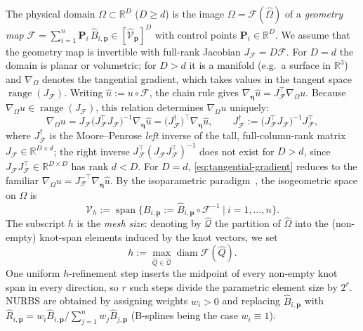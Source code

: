\documentclass{article}
\newcommand{\vect}[1]{\boldsymbol{#1}}
\newcommand{\R}{\mathbb{R}}
\DeclareMathOperator{\spann}{span}
\newcommand{\refdom}{\widehat{\Omega}}            %
\newcommand{\Bref}[2]{\widehat{B}_{#1,#2}}       %
\newcommand{\Bphy}[2]{B_{#1,#2}}                  %
\newcommand{\Rnurbs}[2]{\widehat{R}_{#1,#2}}     %
\newcommand{\Shat}[1]{\widehat{\mathcal{V}}_{#1}} %
\newcommand{\Vglo}{\mathcal{V}_h}                  %
\newcommand{\gmap}{\mathcal{F}}                   %
\theoremstyle{plain}
\numberwithin{equation}{section}
\begin{document}
The physical domain $\Omega \subset \R^{D}$ ($D \ge d$) is the image
$\Omega = \gmap(\refdom)$ of a \emph{geometry map}
$\gmap = \sum_{i=1}^{n} \vect{P}_i\, \Bref{i}{\vect{p}} \in
    [\Shat{\vect{p}}]^{D}$ with control points $\vect{P}_i \in \R^{D}$.
We assume that the geometry map is invertible with full-rank Jacobian $J_{\gmap} = D\gmap$.
For $D = d$ the domain is planar or volumetric; for $D > d$ it is a manifold
(e.g.\ a surface in $\R^3$) and $\nabla_\Omega$ denotes the tangential gradient,
which takes values in the tangent space $\operatorname{range}(J_{\gmap})$.  Writing
$\widehat u := u \circ \gmap$, the chain rule gives
$\nabla_{\vect\eta}\widehat u = J_{\gmap}^{\top}\nabla_\Omega u$.  Because
$\nabla_\Omega u \in \operatorname{range}(J_{\gmap})$, this relation determines
$\nabla_\Omega u$ uniquely:
\begin{equation}
    \nabla_\Omega u
    = J_{\gmap}\bigl(J_{\gmap}^{\top} J_{\gmap}\bigr)^{-1}
    \nabla_{\vect\eta}\widehat u
    = \bigl(J_{\gmap}^{\dagger}\bigr)^{\top}\nabla_{\vect\eta}\widehat u,
    \qquad
    J_{\gmap}^{\dagger} := \bigl(J_{\gmap}^{\top} J_{\gmap}\bigr)^{-1}
    J_{\gmap}^{\top},
    \label{eq:tangential-gradient}
\end{equation}
where $J_{\gmap}^{\dagger}$ is the Moore--Penrose \emph{left} inverse of the
tall, full-column-rank matrix $J_{\gmap} \in \R^{D\times d}$; the right inverse
$J_{\gmap}^{\top}(J_{\gmap}J_{\gmap}^{\top})^{-1}$ does not exist for $D>d$, since
$J_{\gmap}J_{\gmap}^{\top}\in\R^{D\times D}$ has rank $d<D$.  For $D=d$,
\eqref{eq:tangential-gradient} reduces to the familiar
$\nabla_\Omega u = J_{\gmap}^{-\top}\nabla_{\vect\eta}\widehat u$.
By the isoparametric paradigm~\cite{hughes2005isogeometric}, the isogeometric
space on $\Omega$ is
\begin{equation}
    \Vglo := \spann\bigl\{ \Bphy{i}{\vect{p}} := \Bref{i}{\vect{p}} \circ
    \gmap^{-1} \ \big|\ i = 1, \dots, n \bigr\}.
    \label{eq:isogeometric-space}
\end{equation}
The subscript $h$ is the \emph{mesh size}: denoting by $\widehat{\mathcal{Q}}$ the
partition of $\refdom$ into the (non-empty) knot-span elements induced by the
knot vectors, we set
\begin{equation}
    h := \max_{\widehat{Q}\in\widehat{\mathcal{Q}}}
    \operatorname{diam}\gmap(\widehat{Q}).
    \label{eq:mesh-size}
\end{equation}
One uniform $h$-refinement step inserts the midpoint of every non-empty knot
span in every direction, so $r$ such steps divide the parametric element size
by $2^{r}$.
NURBS are obtained by assigning weights $w_i > 0$ and replacing
$\Bref{i}{\vect{p}}$ with $\Rnurbs{i}{\vect{p}} = w_i
    \Bref{i}{\vect{p}} / \sum_{j=1}^n w_j \Bref{j}{\vect{p}}$ (B-splines
being the case $w_i \equiv 1$).
\end{document}
